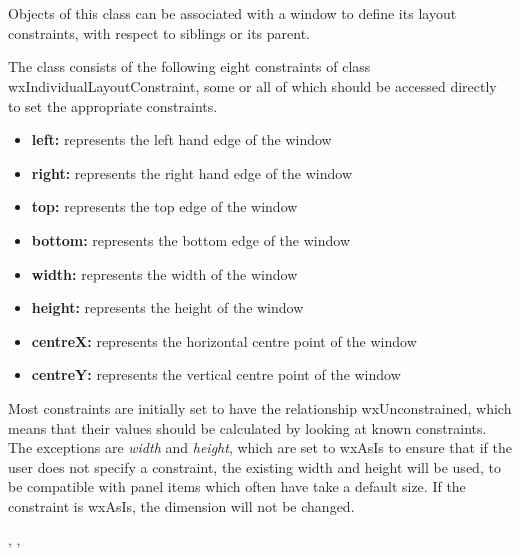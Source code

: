 \section{}\label{wxlayoutconstraints}

Objects of this class can be associated with a window to define its
layout constraints, with respect to siblings or its parent.

The class consists of the following eight constraints of class wxIndividualLayoutConstraint,
some or all of which should be accessed directly to set the appropriate
constraints.

\begin{itemize}\itemsep=0pt
\item {\bf left:} represents the left hand edge of the window
\item {\bf right:} represents the right hand edge of the window
\item {\bf top:} represents the top edge of the window
\item {\bf bottom:} represents the bottom edge of the window
\item {\bf width:} represents the width of the window
\item {\bf height:} represents the height of the window
\item {\bf centreX:} represents the horizontal centre point of the window
\item {\bf centreY:} represents the vertical centre point of the window
\end{itemize}

Most constraints are initially set to have the relationship wxUnconstrained,
which means that their values should be calculated by looking at known constraints.
The exceptions are {\it width} and {\it height}, which are set to wxAsIs to
ensure that if the user does not specify a constraint, the existing
width and height will be used, to be compatible with panel items which often
have take a default size. If the constraint is wxAsIs, the dimension will
not be changed.




,\rtfsp
{}, 



